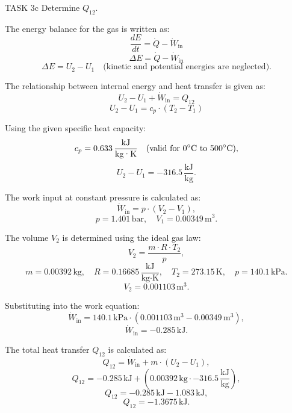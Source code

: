 TASK 3c  
Determine \( Q_{12} \).

The energy balance for the gas is written as:  
\[
\frac{dE}{dt} = \dot{Q} - \dot{W}_{\text{in}}
\]  
\[
\Delta E = \dot{Q} - \dot{W}_{\text{in}}
\]  
\[
\Delta E = U_2 - U_1 \quad \text{(kinetic and potential energies are neglected).}
\]

The relationship between internal energy and heat transfer is given as:  
\[
U_2 - U_1 + \dot{W}_{\text{in}} = Q_{12}
\]  
\[
U_2 - U_1 = c_p \cdot (T_2 - T_1)
\]

Using the given specific heat capacity:  
\[
c_p = 0.633 \, \frac{\text{kJ}}{\text{kg·K}} \quad \text{(valid for \( 0^\circ\text{C} \) to \( 500^\circ\text{C} \))},
\]  
\[
U_2 - U_1 = -316.5 \, \frac{\text{kJ}}{\text{kg}}.
\]

The work input at constant pressure is calculated as:  
\[
\dot{W}_{\text{in}} = p \cdot (V_2 - V_1),
\]  
\[
p = 1.401 \, \text{bar}, \quad V_1 = 0.00349 \, \text{m}^3.
\]

The volume \( V_2 \) is determined using the ideal gas law:  
\[
V_2 = \frac{m \cdot R \cdot T_2}{p},
\]  
\[
m = 0.00392 \, \text{kg}, \quad R = 0.16685 \, \frac{\text{kJ}}{\text{kg·K}}, \quad T_2 = 273.15 \, \text{K}, \quad p = 140.1 \, \text{kPa}.
\]  
\[
V_2 = 0.001103 \, \text{m}^3.
\]

Substituting into the work equation:  
\[
\dot{W}_{\text{in}} = 140.1 \, \text{kPa} \cdot (0.001103 \, \text{m}^3 - 0.00349 \, \text{m}^3),
\]  
\[
\dot{W}_{\text{in}} = -0.285 \, \text{kJ}.
\]

The total heat transfer \( Q_{12} \) is calculated as:  
\[
Q_{12} = \dot{W}_{\text{in}} + m \cdot (U_2 - U_1),
\]  
\[
Q_{12} = -0.285 \, \text{kJ} + (0.00392 \, \text{kg} \cdot -316.5 \, \frac{\text{kJ}}{\text{kg}}),
\]  
\[
Q_{12} = -0.285 \, \text{kJ} - 1.083 \, \text{kJ},
\]  
\[
Q_{12} = -1.3675 \, \text{kJ}.
\]